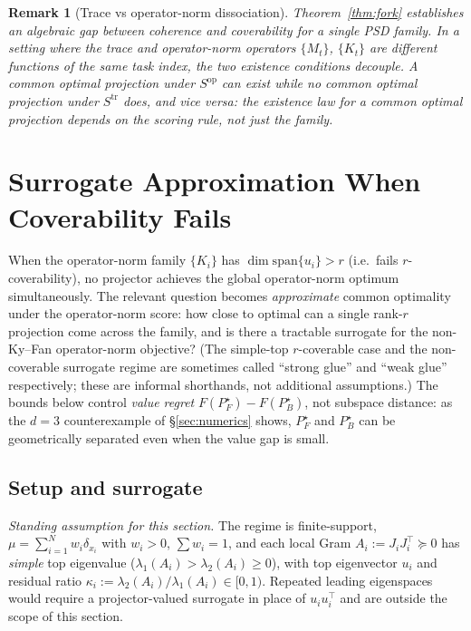 \documentclass[final,3p,times]{elsarticle}
\newtheorem{remark}[theorem]{Remark}
\begin{document}
\begin{remark}[Trace vs operator-norm dissociation]
\label{rem:dissoc}
Theorem~\ref{thm:fork} establishes an algebraic gap between coherence and
coverability for a single PSD family.
In a setting where the trace and operator-norm operators
$\{M_t\}$, $\{K_t\}$ are different functions of the same task index, the
two existence conditions decouple.
A common optimal projection under $S^{\mathrm{op}}$ can exist while no
common optimal projection under $S^{\mathrm{tr}}$ does, and vice versa:
the existence law for a common optimal projection depends on the
scoring rule, not just the family.
\end{remark}

\section{Surrogate Approximation When Coverability Fails}
\label{sec:weakglue}

When the operator-norm family $\{K_i\}$ has $\dim\mathrm{span}\{u_i\}>r$
(i.e.\ fails $r$-coverability), no projector achieves the global
operator-norm optimum simultaneously.
The relevant question becomes \emph{approximate} common optimality under
the operator-norm score: how close to optimal can a single rank-$r$
projection come across the family, and is there a tractable surrogate
for the non-Ky--Fan operator-norm objective?
(The simple-top $r$-coverable case and the non-coverable surrogate
regime are sometimes called ``strong glue'' and ``weak glue''
respectively; these are informal shorthands, not additional assumptions.)
The bounds below control \emph{value regret}
$F(P_F^\star)-F(P_B^\star)$, not subspace distance: as the $d=3$
counterexample of \S\ref{sec:numerics} shows, $P_F^\star$ and $P_B^\star$
can be geometrically separated even when the value gap is small.

\subsection{Setup and surrogate}

\emph{Standing assumption for this section.}
The regime is finite-support, $\mu=\sum_{i=1}^N w_i\delta_{x_i}$ with
$w_i>0$, $\sum w_i=1$, and each local Gram $A_i:=J_iJ_i^\top\succeq 0$
has \emph{simple} top eigenvalue ($\lambda_1(A_i)>\lambda_2(A_i)\ge 0$),
with top eigenvector $u_i$ and residual ratio
$\kappa_i:=\lambda_2(A_i)/\lambda_1(A_i)\in[0,1)$.
Repeated leading eigenspaces would require a projector-valued surrogate
in place of $u_i u_i^\top$ and are outside the scope of this section.
\end{document}
